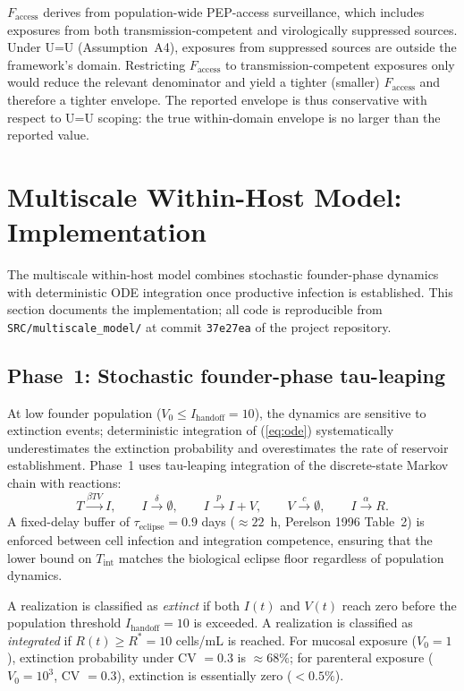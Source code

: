 \documentclass[11pt]{article}
\theoremstyle{definition}
\theoremstyle{remark}
\newcommand{\Tint}{T_{\text{int}}}
\newcommand{\Faccess}{F_{\text{access}}}
\begin{document}
$\Faccess$ derives from population-wide PEP-access surveillance, which includes exposures from both transmission-competent and virologically suppressed sources. Under U=U (Assumption~A4), exposures from suppressed sources are outside the framework's domain. Restricting $\Faccess$ to transmission-competent exposures only would reduce the relevant denominator and yield a tighter (smaller) $\Faccess$ and therefore a tighter envelope. The reported envelope is thus conservative with respect to U=U scoping: the true within-domain envelope is no larger than the reported value.

\section{Multiscale Within-Host Model: Implementation}

The multiscale within-host model combines stochastic founder-phase dynamics with deterministic ODE integration once productive infection is established. This section documents the implementation; all code is reproducible from \texttt{SRC/multiscale\_model/} at commit \texttt{37e27ea} of the project repository.

\subsection{Phase~1: Stochastic founder-phase tau-leaping}

At low founder population ($V_{0} \leq I_{\text{handoff}} = 10$), the dynamics are sensitive to extinction events; deterministic integration of (\ref{eq:ode}) systematically underestimates the extinction probability and overestimates the rate of reservoir establishment. Phase~1 uses tau-leaping integration of the discrete-state Markov chain with reactions:
\[
T \xrightarrow{\beta T V} I, \qquad I \xrightarrow{\delta} \emptyset, \qquad I \xrightarrow{p} I + V, \qquad V \xrightarrow{c} \emptyset, \qquad I \xrightarrow{\alpha} R.
\]
A fixed-delay buffer of $\tau_{\text{eclipse}} = 0.9$ days ($\approx 22$~h, Perelson 1996 Table~2)\cite{perelson1996_si} is enforced between cell infection and integration competence, ensuring that the lower bound on $\Tint$ matches the biological eclipse floor regardless of population dynamics.

A realization is classified as \emph{extinct} if both $I(t)$ and $V(t)$ reach zero before the population threshold $I_{\text{handoff}} = 10$ is exceeded. A realization is classified as \emph{integrated} if $R(t) \geq R^{*} = 10$ cells/mL is reached. For mucosal exposure ($V_{0} = 1$), extinction probability under CV $= 0.3$ is $\approx 68\%$; for parenteral exposure ($V_{0} = 10^{3}$, CV $= 0.3$), extinction is essentially zero ($<0.5\%$).
\end{document}
